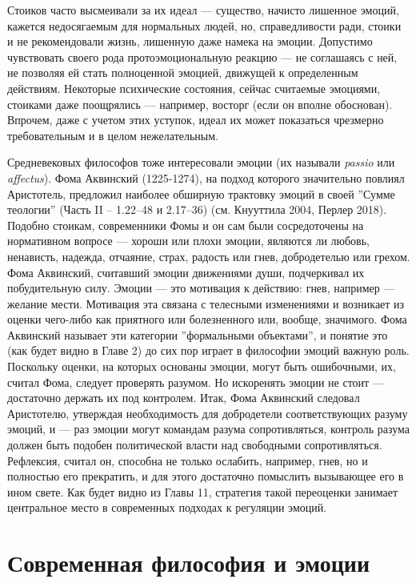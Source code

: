 \documentclass[11pt]{book}
\begin{document}
Стоиков часто высмеивали за их идеал --- существо, начисто лишенное эмоций, кажется недосягаемым для нормальных людей, но, справедливости ради, стоики и не рекомендовали жизнь, лишенную даже намека на эмоции. Допустимо чувствовать своего рода протоэмоциональную реакцию --- не соглашаясь с ней, не позволяя ей стать полноценной эмоцией, движущей к определенным действиям. Некоторые психические состояния, сейчас считаемые эмоциями, стоиками даже поощрялись --- например, восторг (если он вполне обоснован). Впрочем, даже с учетом этих уступок, идеал их может показаться чрезмерно требовательным и в целом нежелательным.

Средневековых философов тоже интересовали эмоции (их называли \textit{passio} или \textit{affectus}). Фома Аквинский (1225-1274), на подход которого значительно повлиял Аристотель, предложил наиболее обширную трактовку эмоций в своей ''Сумме теологии'' (Часть II -- 1.22--48 и 2.17--36) (см. Кнууттила 2004, Перлер 2018). Подобно стоикам, современники Фомы и он сам были сосредоточены на нормативном вопросе --- хороши или плохи эмоции, являются ли любовь, ненависть, надежда, отчаяние, страх, радость или гнев, добродетелью или грехом. Фома Аквинский, считавший эмоции движениями души, подчеркивал их побудительную силу. Эмоции --- это мотивация к действию: гнев, например --- желание мести. Мотивация эта связана с телесными изменениями и возникает из оценки чего-либо как приятного или болезненного или, вообще, значимого. Фома Аквинский называет эти категории ''формальными объектами'', и понятие это (как будет видно в Главе 2) до сих пор играет в философии эмоций важную роль. Поскольку оценки, на которых основаны эмоции, могут быть ошибочными, их, считал Фома, следует проверять разумом. Но искоренять эмоции не стоит --- достаточно держать их под контролем. Итак, Фома Аквинский следовал Аристотелю, утверждая необходимость для добродетели соответствующих разуму эмоций, и --- раз эмоции могут командам разума сопротивляться, контроль разума должен быть подобен политической власти над свободными сопротивляться. Рефлексия, считал он, способна не только ослабить, например, гнев, но и полностью его прекратить, и для этого достаточно помыслить вызывающее его в ином свете. Как будет видно из Главы 11, стратегия такой переоценки занимает центральное место в современных подходах к регуляции эмоций.

\section{Современная философия и эмоции}
\end{document}
